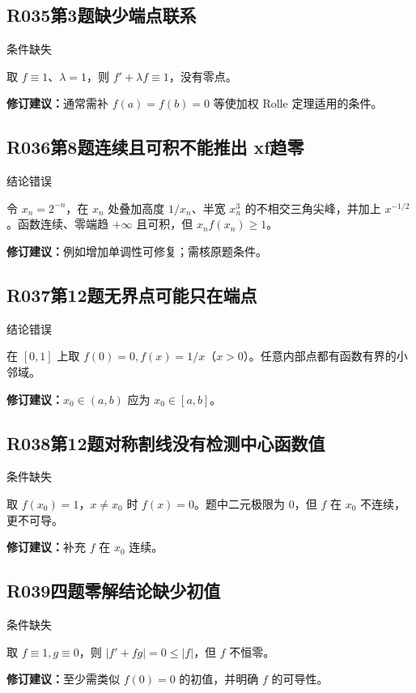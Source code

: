 \subsection*{R035\quad 第3题缺少端点联系}
\noindent{}\quad 条件缺失\par
取 $f\equiv1$、$\lambda=1$，则 $f'+\lambda f\equiv1$，没有零点。
\par\textbf{修订建议：}通常需补 $f(a)=f(b)=0$ 等使加权 Rolle 定理适用的条件。\par
{}
\subsection*{R036\quad 第8题连续且可积不能推出 xf趋零}
\noindent{}\quad 结论错误\par
令 $x_n=2^{-n}$，在 $x_n$ 处叠加高度 $1/x_n$、半宽 $x_n^3$ 的不相交三角尖峰，并加上 $x^{-1/2}$。函数连续、零端趋 $+\infty$ 且可积，但 $x_nf(x_n)\ge1$。
\par\textbf{修订建议：}例如增加单调性可修复；需核原题条件。\par
{}
\subsection*{R037\quad 第12题无界点可能只在端点}
\noindent{}\quad 结论错误\par
在 $[0,1]$ 上取 $f(0)=0,f(x)=1/x$（$x>0$）。任意内部点都有函数有界的小邻域。
\par\textbf{修订建议：}$x_0\in(a,b)$ 应为 $x_0\in[a,b]$。\par
{}
\subsection*{R038\quad 第12题对称割线没有检测中心函数值}
\noindent{}\quad 条件缺失\par
取 $f(x_0)=1$，$x\ne x_0$ 时 $f(x)=0$。题中二元极限为 $0$，但 $f$ 在 $x_0$ 不连续，更不可导。
\par\textbf{修订建议：}补充 $f$ 在 $x_0$ 连续。\par
{}
\subsection*{R039\quad 四题零解结论缺少初值}
\noindent{}\quad 条件缺失\par
取 $f\equiv1,g\equiv0$，则 $|f'+fg|=0\le|f|$，但 $f$ 不恒零。
\par\textbf{修订建议：}至少需类似 $f(0)=0$ 的初值，并明确 $f$ 的可导性。\par
{}
